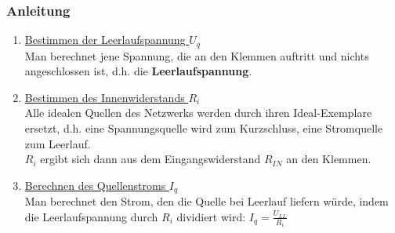 \subsubsection*{Anleitung}
\begin{enumerate}
    \item \underline{Bestimmen der Leerlaufspannung $U_q$} \\
    Man berechnet jene Spannung, die an den Klemmen auftritt und nichts angeschlossen ist, d.h. die \textbf{Leerlaufspannung}.
    
    \item \underline{Bestimmen des Innenwiderstands $R_i$} \\
    Alle idealen Quellen des Netzwerks werden durch ihren Ideal-Exemplare ersetzt, d.h. eine Spannungsquelle wird zum Kurzschluss, eine Stromquelle zum Leerlauf. \\
    $R_i$ ergibt sich dann aus dem Eingangswiderstand $R_{IN}$ an den Klemmen.
    
    \item \underline{Berechnen des Quellenstroms $I_q$} \\
    Man berechnet den Strom, den die Quelle bei Leerlauf liefern würde, indem die Leerlaufspannung durch $R_i$ dividiert wird: $I_q = \frac{U_{LL}}{R_i}$ 
\end{enumerate}

